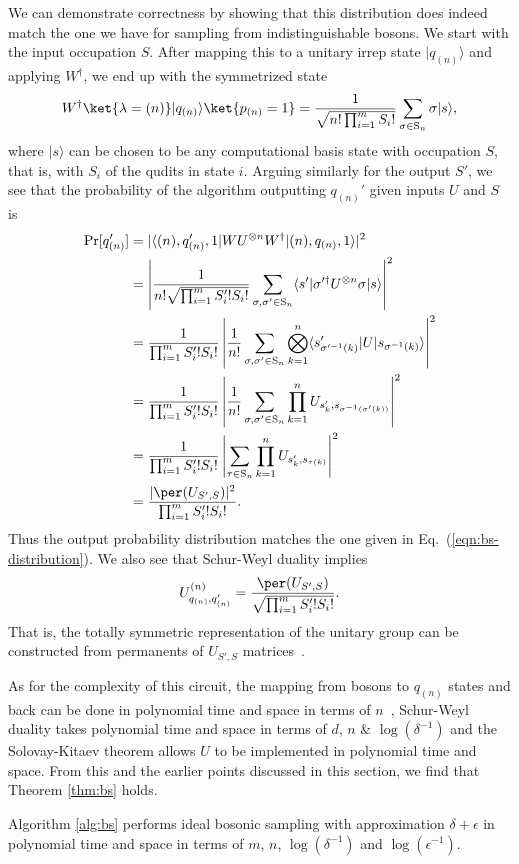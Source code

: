 We can demonstrate correctness by showing that this distribution does indeed match the one we have for sampling from indistinguishable bosons. 
We start with the input occupation $S$. 
After mapping this to a unitary irrep state $|q_{(n)}\rangle$ and applying $W^\dagger$, we end up with the symmetrized state
\begin{equation}\label{eq:IdealState}
W^\dagger\ket{\lambda=(n)}|q_{(n)}\rangle\ket{p_{(n)}=1}
 = \frac{1}{\sqrt{n! \prod_{i=1}^m S_i!}}\sum_{\sigma \in  \textrm{S}_n}\sigma|s\rangle ,
\end{equation}
where $|s\rangle$ can be chosen to be any computational basis state with occupation $S$, that is, with $S_i$ of the qudits in state $i$.
Arguing similarly for the output $S'$, we see that the probability of the algorithm outputting $q_{(n)}'$ given inputs $U$ and $S$ is
\begin{align}
\textrm{Pr}[q_{(n)}']
&= \vert \langle (n), q_{(n)}', 1\vert W U^{\otimes n} W^\dag |(n), q_{(n)}, 1\rangle \vert^2 \\
&= \left|\frac{1}{n!\sqrt{\prod_{i=1}^m S'_i! S_i!}}\sum_{\sigma, \sigma'\in \textrm{S}_n}\langle s'|{\sigma}'^\dag{U}^{\otimes n}{\sigma}|s\rangle\right|^2\\
&= \frac{1}{\prod_{i=1}^m S'_i! S_i!}\left|\frac{1}{n!}\sum_{\sigma, \sigma'\in \textrm{S}_n}\bigotimes_{k=1}^n \langle s'_{\sigma'^{-1}(k)}|{U}|s_{\sigma^{-1}(k)}\rangle\right|^2\\
&= \frac{1}{\prod_{i=1}^m S'_i! S_i!}\left|\frac{1}{n!}\sum_{\sigma, \sigma'\in \textrm{S}_n}\prod_{k=1}^n U_{s'_{k},s_{\sigma^{-1}(\sigma'(k))}}\right|^2\\
&= \frac{1}{\prod_{i=1}^m S'_i! S_i!}\left|\sum_{\tau \in \textrm{S}_n}\prod_{k=1}^n U_{s'_{k},s_{\tau(k)}}\right|^2\\
&= \frac{|\per(U_{S',S})|^2}{\prod_{i=1}^m S'_i! S_i!}.
\end{align}
Thus the output probability distribution matches the one given in Eq.~(\ref{eqn:bs-distribution}).
We also see that Schur-Weyl duality implies
\begin{equation}
U^{(n)}_{q_{(n)}, q_{(n)}'} = \frac{\per(U_{S',S})}{\sqrt{\prod_{i=1}^m S'_i! S_i!}}.
\label{eqn:symmetric_action}
\end{equation}
That is, the totally symmetric representation of the unitary group can be constructed from permanents of $U_{S',S}$ matrices~\cite{bhatia1997}.

As for the complexity of this circuit, the mapping from bosons to $q_{(n)}$ states and back can be done in polynomial time and space in terms of $n$~\cite{rowe1999}, Schur-Weyl duality takes polynomial time and space in terms of $d$, $n$ \& $\log(\delta^{-1})$ and the Solovay-Kitaev theorem allows $U$ to be implemented in polynomial time and space. 
From this and the earlier points discussed in this section, we find that Theorem \ref{thm:bs} holds.
\begin{theorem}
Algorithm \ref{alg:bs} performs ideal bosonic sampling with approximation $\delta+\epsilon$ in polynomial time and space in terms of $m$, $n$, $\log(\delta^{-1})$ and $\log(\epsilon^{-1})$.
\label{thm:bs}
\end{theorem}

